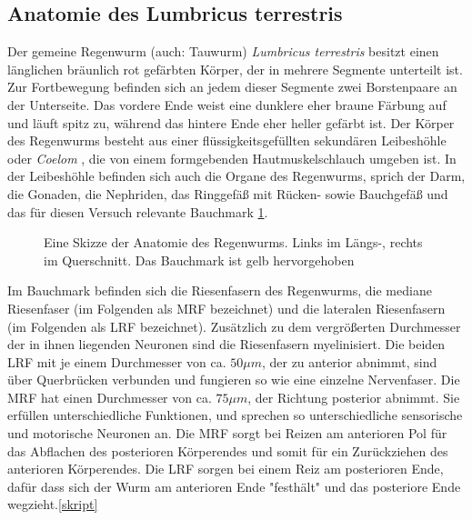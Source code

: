 \documentclass[11pt]{article}
\begin{document}
\subsection{Anatomie des Lumbricus terrestris}
Der gemeine Regenwurm (auch: Tauwurm) \textit{Lumbricus terrestris} besitzt einen länglichen bräunlich rot gefärbten Körper, der in mehrere Segmente unterteilt ist. Zur Fortbewegung befinden sich an jedem dieser Segmente zwei Borstenpaare an der Unterseite. Das vordere Ende weist eine dunklere eher braune Färbung auf und läuft spitz zu, während das hintere Ende eher heller gefärbt ist. Der Körper des Regenwurms besteht aus einer flüssigkeitsgefüllten sekundären Leibeshöhle oder \textit{Coelom} , die von einem formgebenden Hautmuskelschlauch umgeben ist. In der Leibeshöhle befinden sich auch die Organe des Regenwurms, sprich der Darm, die Gonaden, die Nephriden, das Ringgefäß mit Rücken- sowie Bauchgefäß und das für diesen Versuch relevante Bauchmark \ref{bauchmark}. 
\begin{figure}[H]
\makebox[\textwidth][c]{}
\caption{Eine Skizze der Anatomie des Regenwurms. Links im Längs-, rechts im Querschnitt. Das Bauchmark ist gelb hervorgehoben}
\label{bauchmark}
\end{figure}
Im Bauchmark befinden sich die Riesenfasern des Regenwurms, die mediane Riesenfaser (im Folgenden als MRF bezeichnet) und die lateralen Riesenfasern (im Folgenden als LRF bezeichnet). Zusätzlich zu dem vergrößerten Durchmesser der in ihnen liegenden Neuronen sind die Riesenfasern myelinisiert. Die beiden LRF mit je einem Durchmesser von ca. $50 \mu m$, der zu anterior abnimmt, sind über Querbrücken verbunden und fungieren so wie eine einzelne Nervenfaser. Die MRF hat einen Durchmesser von ca. $75 \mu m$, der Richtung posterior abnimmt. Sie erfüllen unterschiedliche Funktionen, und sprechen so unterschiedliche sensorische und motorische Neuronen an. Die MRF sorgt bei Reizen am anterioren Pol für das Abflachen des posterioren Körperendes und somit für ein Zurückziehen des anterioren Körperendes. Die LRF sorgen bei einem Reiz am posterioren Ende, dafür dass sich der Wurm am anterioren Ende "{}festhält"{} und das posteriore Ende wegzieht.\ref{skript}
\end{document}
